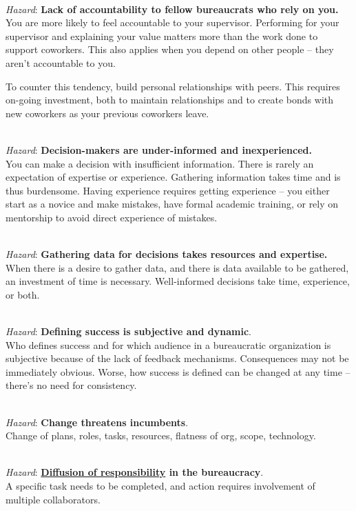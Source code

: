 \ \\
\begin{samepage}
\textit{Hazard}: \textbf{Lack of accountability to fellow bureaucrats who rely on you.}\\
You are more likely to feel accountable to your supervisor. Performing for your supervisor and explaining your value matters more than the work done to support coworkers.  This also applies when you depend on other people -- they aren't accountable to you.

To counter this tendency, build personal relationships with peers. This requires on-going investment, both to maintain relationships and to create bonds with new coworkers as your previous coworkers leave.
\end{samepage}

\ \\
\textit{Hazard}: \textbf{Decision-makers are under-informed and inexperienced.}\\
You can make a decision with insufficient information. There is rarely an expectation of expertise or experience. 
Gathering information takes time and is thus burdensome.
Having experience requires getting experience -- you either start as a novice and make mistakes, have formal academic training, or rely on mentorship to avoid direct experience of mistakes.

\ \\
\textit{Hazard}: \textbf{Gathering data for decisions takes resources and expertise.}\\
When there is a desire to gather data, and there is data available to be gathered, an investment of time is necessary. Well-informed decisions take time, experience, or both.

\ \\
\textit{Hazard}: \textbf{Defining success is subjective and dynamic}. \\
Who defines success and for which audience in a bureaucratic organization is subjective because of the lack of feedback mechanisms. Consequences may not be immediately obvious. Worse, how success is defined can be changed at any time -- there's no need for consistency. 

\ \\
\textit{Hazard}: \textbf{Change threatens incumbents}. \\
Change of plans, roles, tasks, resources, flatness of org, scope, technology.

\ \\
\textit{Hazard}: \textbf{\href{https://en.wikipedia.org/wiki/Diffusion_of_responsibility}{Diffusion of responsibility} 
in the bureaucracy}. \\
A specific task needs to be completed, and action requires involvement of multiple collaborators. 


